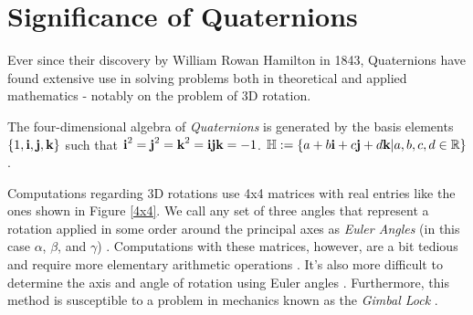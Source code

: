 \section{Significance of Quaternions}

Ever since their discovery by William Rowan Hamilton in 1843, Quaternions have found extensive use in solving problems both in theoretical and applied mathematics - notably on the problem of 3D rotation. 

\begin{definition}[Quaternion]
	The four-dimensional algebra of \emph{Quaternions} is generated by the basis elements $\{1,\textbf{i},\textbf{j},\textbf{k}\}$ such that $\textbf{i}^2 = \textbf{j}^2 = \textbf{k}^2 = \textbf{i} \textbf{j} \textbf{k} = -1$. $\operatorname{\mathbb{H}} := \{a + b\textbf{i} + c\textbf{j} + d\textbf{k} | a,b,c,d \in \operatorname{\mathbb{R}}\}$.
\end{definition}

Computations regarding 3D rotations use 4x4 matrices with real entries like the ones shown in Figure \ref{4x4}. We call any set of three angles that represent a rotation applied in some order around the principal axes as \emph{Euler Angles} (in this case $\alpha$, $\beta$, and $\gamma$) \cite{lerios}. Computations with these matrices, however, are a bit tedious and require more elementary arithmetic operations \cite{lerios}. It's also more difficult to determine the axis and angle of rotation using Euler angles \cite{lerios}. Furthermore, this method is susceptible to a problem in mechanics known as the \emph{Gimbal Lock} \cite{jia}.

